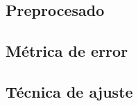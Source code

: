 \documentclass[a4paper, 20pt]{article}
\begin{document}
\subsection{Preprocesado}



\subsection{Métrica de error}

\subsection{Técnica de ajuste}


\end{document}

